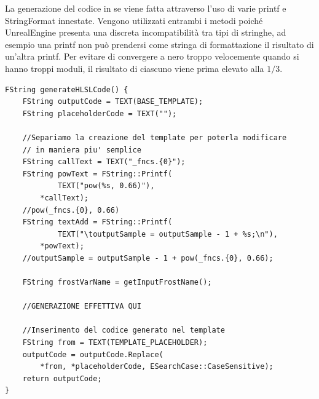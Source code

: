 \documentclass[main.tex]{subfiles}
\begin{document}
La generazione del codice in se viene fatta attraverso l'uso di varie printf e StringFormat innestate. Vengono utilizzati entrambi i metodi poiché UnrealEngine presenta una discreta incompatibilità tra tipi di stringhe, ad esempio una printf non può prendersi come stringa di formattazione il risultato di un'altra printf. \newline 
Per evitare di convergere a nero troppo velocemente quando si hanno troppi moduli, il risultato di ciascuno viene prima elevato alla $1/3$.
\lstset{language=UEcpp}
\begin{lstlisting}
FString generateHLSLCode() {
    FString outputCode = TEXT(BASE_TEMPLATE);
    FString placeholderCode = TEXT("");

    //Separiamo la creazione del template per poterla modificare
    // in maniera piu' semplice
    FString callText = TEXT("_fncs.{0}");
    FString powText = FString::Printf(
            TEXT("pow(%s, 0.66)"),
        *callText);
    //pow(_fncs.{0}, 0.66)
    FString textAdd = FString::Printf(
            TEXT("\toutputSample = outputSample - 1 + %s;\n"),
        *powText);
    //outputSample = outputSample - 1 + pow(_fncs.{0}, 0.66);
    
    FString frostVarName = getInputFrostName();

    //GENERAZIONE EFFETTIVA QUI

    //Inserimento del codice generato nel template
    FString from = TEXT(TEMPLATE_PLACEHOLDER);
	outputCode = outputCode.Replace(
        *from, *placeholderCode, ESearchCase::CaseSensitive);
	return outputCode;
}
\end{lstlisting}
\end{document}
